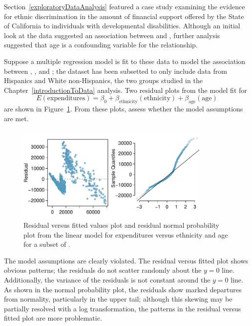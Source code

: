 \begin{example}{Section~\ref{exploratoryDataAnalysis} featured a case study examining the evidence for ethnic discrimination in the amount of financial support offered by the State of California to individuals with developmental disabilities. Although an initial look at the data suggested an association between  and , further analysis suggested that age is a confounding variable for the relationship.

Suppose a multiple regression model is fit to these data to model the association between , , and ; the dataset  has been subsetted to only include data from Hispanics and White non-Hispanics, the two groups studied in the Chapter~\ref{introductionToData}	analysis. Two residual plots from the model fit for 
\[E(\text{expenditures}) = \beta_0 +  \beta_{\text{ethnicity}}(\text{ethnicity}) + \beta_{\text{age}}(\text{age}) \]
are shown in Figure~\ref{ddsAgeEthnicityResidNormPlot}. From these plots, assess whether the model assumptions are met. 

\begin{figure}[h!]
	\centering
	\includegraphics[width=0.85\textwidth]
	{ch_multiple_linear_regression_oi_biostat/figures/ddsAgeEthnicityResidNormPlot/ddsAgeEthnicityResidNormPlot.pdf}
	\caption{Residual versus fitted values plot and residual normal probability plot from the linear model for expenditures versus ethnicity and age for a subset of .}
	\label{ddsAgeEthnicityResidNormPlot}
\end{figure}		
		
		
}

The model assumptions are clearly violated. The residual versus fitted plot	shows obvious patterns; the residuals do not scatter randomly about the $y = 0$ line. Additionally, the variance of the residuals is not constant around the $y = 0$ line. As shown in the normal probability plot, the residuals show marked departures from normality, particularly in the upper tail; although this skewing may be partially resolved with a log transformation, the patterns in the residual versus fitted plot are more problematic.


\end{example}
